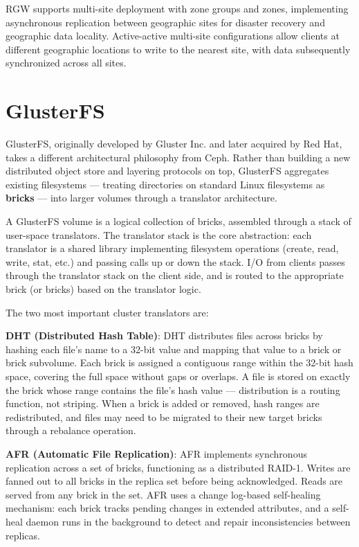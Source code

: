 RGW supports multi-site deployment with zone groups and zones, implementing asynchronous replication between geographic sites for disaster recovery and geographic data locality. Active-active multi-site configurations allow clients at different geographic locations to write to the nearest site, with data subsequently synchronized across all sites.

\section{GlusterFS}
GlusterFS, originally developed by Gluster Inc. and later acquired by Red Hat, takes a different architectural philosophy from Ceph. Rather than building a new distributed object store and layering protocols on top, GlusterFS aggregates existing filesystems --- treating directories on standard Linux filesystems as \textbf{bricks} --- into larger volumes through a translator architecture.

A GlusterFS volume is a logical collection of bricks, assembled through a stack of user-space translators. The translator stack is the core abstraction: each translator is a shared library implementing filesystem operations (create, read, write, stat, etc.) and passing calls up or down the stack. I/O from clients passes through the translator stack on the client side, and is routed to the appropriate brick (or bricks) based on the translator logic.

The two most important cluster translators are:

\textbf{DHT (Distributed Hash Table)}: DHT distributes files across bricks by hashing each file's name to a 32-bit value and mapping that value to a brick or brick subvolume. Each brick is assigned a contiguous range within the 32-bit hash space, covering the full space without gaps or overlaps. A file is stored on exactly the brick whose range contains the file's hash value --- distribution is a routing function, not striping. When a brick is added or removed, hash ranges are redistributed, and files may need to be migrated to their new target bricks through a rebalance operation.

\textbf{AFR (Automatic File Replication)}: AFR implements synchronous replication across a set of bricks, functioning as a distributed RAID-1. Writes are fanned out to all bricks in the replica set before being acknowledged. Reads are served from any brick in the set. AFR uses a change log-based self-healing mechanism: each brick tracks pending changes in extended attributes, and a self-heal daemon runs in the background to detect and repair inconsistencies between replicas.

